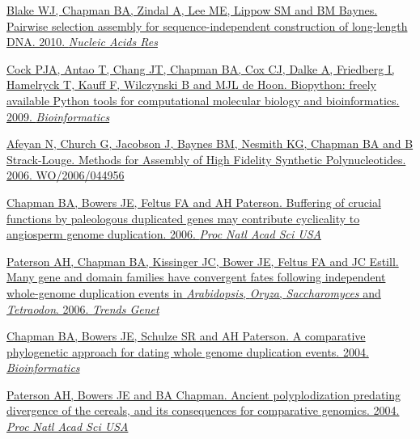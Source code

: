 \documentclass[10pt]{article}
\makeatletter
\newlength{\bibhang}
\newlength{\bibsep}
 {\@listi \global\bibsep\itemsep \global\advance\bibsep by\parsep}
\newenvironment{bibsection}%
        {\vspace{-\baselineskip}\begin{list}{}{%
       \setlength{\leftmargin}{\bibhang}%
       \setlength{\itemindent}{-\leftmargin}%
       \setlength{\itemsep}{\bibsep}%
       \setlength{\parsep}{\z@}%
        \setlength{\partopsep}{0pt}%
        \setlength{\topsep}{0pt}}}
        {\end{list}\vspace{-.6\baselineskip}}
\makeatother
\begin{document}
\begin{bibsection}
   \item \href{http://nar.oxfordjournals.org/content/38/8/2594.long}
     {Blake WJ, Chapman BA, Zindal A, Lee ME, Lippow SM and BM Baynes.
     Pairwise selection assembly for sequence-independent
     construction of long-length DNA. 2010. \textit{Nucleic Acids Res}}

  \item \href{http://bioinformatics.oxfordjournals.org/content/25/11/1422.long}
    {Cock PJA, Antao T, Chang JT, Chapman BA, Cox CJ, Dalke A, Friedberg I,
    Hamelryck T, Kauff F, Wilczynski B and MJL de Hoon.
    Biopython: freely available Python tools for
     computational molecular biology and bioinformatics. 2009.
     \textit{Bioinformatics}}

  \item \href{http://www.google.com/patents/about?id=j2yYAAAAEBAJ}
    {Afeyan N, Church G, Jacobson J, Baynes BM, Nesmith KG, Chapman BA 
    and B Strack-Louge.
    Methods for Assembly of High Fidelity Synthetic
     Polynucleotides. 2006. WO/2006/044956}

   \item \href{http://www.pnas.org/content/103/8/2730.long}
     {Chapman BA, Bowers JE, Feltus FA and AH Paterson.
     Buffering of crucial functions by paleologous
     duplicated genes may contribute cyclicality to angiosperm genome
     duplication. 2006. \textit{Proc Natl Acad Sci USA}}

  \item \href{http://linkinghub.elsevier.com/retrieve/pii/S0168-9525(06)00296-4}
    {Paterson AH, Chapman BA, Kissinger JC, Bower JE, Feltus FA and JC Estill.
    Many gene and domain families have convergent fates
    following independent whole-genome duplication events in
    \textit{Arabidopsis}, \textit{Oryza}, \textit{Saccharomyces} and
    \textit{Tetraodon}. 2006. \textit{Trends Genet}}

  \item \href{http://bioinformatics.oxfordjournals.org/content/20/2/180.abstract}
    {Chapman BA, Bowers JE, Schulze SR and AH Paterson.
    A comparative phylogenetic approach for dating whole genome
    duplication events. 2004. \textit{Bioinformatics}}

  \item \href{http://www.pnas.org/content/101/26/9903.long}
    {Paterson AH, Bowers JE and BA Chapman.
    Ancient polyplodization predating divergence of the
    cereals, and its consequences for comparative genomics. 2004.
    \textit{Proc Natl Acad Sci USA}}


\end{bibsection}
\end{document}
